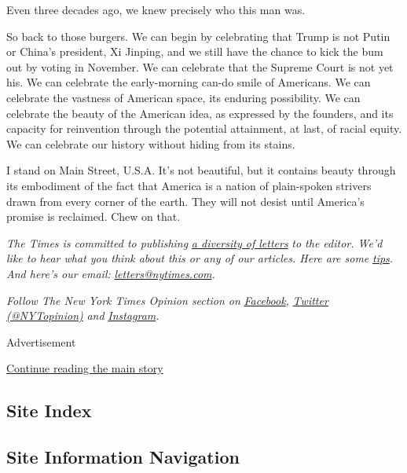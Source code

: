 Even three decades ago, we knew precisely who this man was.

So back to those burgers. We can begin by celebrating that Trump is not
Putin or China's president, Xi Jinping, and we still have the chance to
kick the bum out by voting in November. We can celebrate that the
Supreme Court is not yet his. We can celebrate the early-morning can-do
smile of Americans. We can celebrate the vastness of American space, its
enduring possibility. We can celebrate the beauty of the American idea,
as expressed by the founders, and its capacity for reinvention through
the potential attainment, at last, of racial equity. We can celebrate
our history without hiding from its stains.

I stand on Main Street, U.S.A. It's not beautiful, but it contains
beauty through its embodiment of the fact that America is a nation of
plain-spoken strivers drawn from every corner of the earth. They will
not desist until America's promise is reclaimed. Chew on that.

\emph{The Times is committed to publishing}
\href{https://www.nytimes.com/2019/01/31/opinion/letters/letters-to-editor-new-york-times-women.html}{\emph{a
diversity of letters}} \emph{to the editor. We'd like to hear what you
think about this or any of our articles. Here are some}
\href{https://help.nytimes.com/hc/en-us/articles/115014925288-How-to-submit-a-letter-to-the-editor}{\emph{tips}}\emph{.
And here's our email:}
\href{mailto:letters@nytimes.com}{\emph{letters@nytimes.com}}\emph{.}

\emph{Follow The New York Times Opinion section on}
\href{https://www.facebook.com/nytopinion}{\emph{Facebook}}\emph{,}
\href{http://twitter.com/NYTOpinion}{\emph{Twitter (@NYTopinion)}}
\emph{and}
\href{https://www.instagram.com/nytopinion/}{\emph{Instagram}}\emph{.}

Advertisement

\protect\hyperlink{after-bottom}{Continue reading the main story}

\hypertarget{site-index}{%
\subsection{Site Index}\label{site-index}}

\hypertarget{site-information-navigation}{%
\subsection{Site Information
Navigation}\label{site-information-navigation}}

